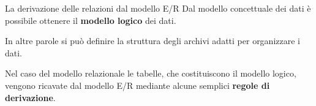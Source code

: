 \def\ERDipendenteAutoAziendale{
    \begin{tikzpicture}[remember picture]
        \tikzstyle{rectangle} = [draw, minimum width=3cm, minimum height=1cm]
        \tikzstyle{rhombus} = [draw, diamond, minimum width=3cm, minimum height=1cm, aspect=2]
        \node[rectangle] (rect1) at (1.5, -1) {
            \scriptsize
                \begin{tabular}{c}
                    \textbf{Dipendente} \\
                    \hline
                    Matricola \{PK\} \\
                    Cognome \\
                    Nome \\
                    DataNascita \\
                    LuogoNascita \\
                \end{tabular}
        };
        \node[rhombus] (rhombus) at (7, -1) {\scriptsize EssereAssegnata};
        \node[rectangle] (rect2) at (12.5, -1) {
            \scriptsize
                \begin{tabular}{c}
                    \textbf{AutoAziendale} \\
                    \hline
                    Targa \{PK\} \\
                    Modello \\
                    Costruttore \\
                    Cilindrata \\
                \end{tabular}
            };

        \draw (rect1) -- (rhombus) node[midway, above] {(0,1)};
        \draw (rhombus) -- (rect2) node[midway, above] {(1,1)};
    \end{tikzpicture}
}
\begin{frame}{La derivazione delle relazioni dal modello E/R}
Dal modello concettuale dei dati \`e possibile ottenere il \textbf{modello logico} dei dati.

\pause
In altre parole si pu\`o definire la struttura degli archivi adatti per organizzare i dati.

\pause
Nel caso del modello relazionale le tabelle, che costituiscono il modello logico, vengono ricavate dal modello E/R mediante alcune semplici \textbf{regole di derivazione}.
\end{frame}

